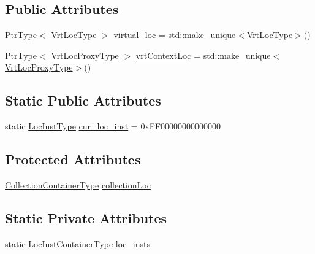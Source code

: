 \subsection*{Public Attributes}
\begin{DoxyCompactItemize}
\item 
\hyperlink{structvt_1_1location_1_1_location_manager_a32d8bca6ed6909a2190286408335d3b4}{Ptr\+Type}$<$ \hyperlink{structvt_1_1location_1_1_location_manager_a06ec1698d93780afdf7873eeaa3a77b6}{Vrt\+Loc\+Type} $>$ \hyperlink{structvt_1_1location_1_1_location_manager_af8cbcba6c30a17a56d69fcf48007cdad}{virtual\+\_\+loc} = std\+::make\+\_\+unique$<$\hyperlink{structvt_1_1location_1_1_location_manager_a06ec1698d93780afdf7873eeaa3a77b6}{Vrt\+Loc\+Type}$>$()
\item 
\hyperlink{structvt_1_1location_1_1_location_manager_a32d8bca6ed6909a2190286408335d3b4}{Ptr\+Type}$<$ \hyperlink{structvt_1_1location_1_1_location_manager_a3e410c85f5790a526a4eda22a9cc7881}{Vrt\+Loc\+Proxy\+Type} $>$ \hyperlink{structvt_1_1location_1_1_location_manager_aec12685db3f4c7c9fec6348496689174}{vrt\+Context\+Loc} = std\+::make\+\_\+unique$<$\hyperlink{structvt_1_1location_1_1_location_manager_a3e410c85f5790a526a4eda22a9cc7881}{Vrt\+Loc\+Proxy\+Type}$>$()
\end{DoxyCompactItemize}
\subsection*{Static Public Attributes}
\begin{DoxyCompactItemize}
\item 
static \hyperlink{namespacevt_1_1location_a4db6456e8024af2d23fc5ae560fef866}{Loc\+Inst\+Type} \hyperlink{structvt_1_1location_1_1_location_manager_a644b4b030fd616375728316281295250}{cur\+\_\+loc\+\_\+inst} = 0x\+F\+F00000000000000
\end{DoxyCompactItemize}
\subsection*{Protected Attributes}
\begin{DoxyCompactItemize}
\item 
\hyperlink{structvt_1_1location_1_1_location_manager_a03472723aecf57cd99cd221ef2164edb}{Collection\+Container\+Type} \hyperlink{structvt_1_1location_1_1_location_manager_a748aa3659f6aee39fb0936e694aa74ac}{collection\+Loc}
\end{DoxyCompactItemize}
\subsection*{Static Private Attributes}
\begin{DoxyCompactItemize}
\item 
static \hyperlink{structvt_1_1location_1_1_location_manager_adf4df6480ad89271a802d6d59bcf424e}{Loc\+Inst\+Container\+Type} \hyperlink{structvt_1_1location_1_1_location_manager_ae1f3b1c4bf75a14fce51a284bd692fe3}{loc\+\_\+insts}
\end{DoxyCompactItemize}


